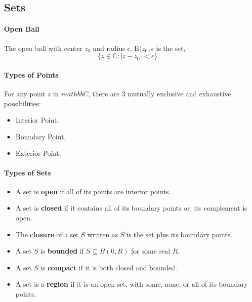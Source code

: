 \documentclass[12pt, letterpaper]{article}
\begin{document}
    \subsection{Sets}
    \paragraph{Open Ball}
    The open ball with center \(z_0\) and radius \(\epsilon\), \(\mathrm{B}(z_0, \epsilon\) is the set,
    \[\{z\in \mathbb{C}: |z-z_0| < \epsilon\}.\]
    
    \paragraph{Types of Points} For any point \(z\) in \(mathbb{C}\), there are 3 mutually exclusive and exhaustive possibilities:
    \begin{itemize}
        \item Interior Point,
        \item Boundary Point,
        \item Exterior Point.
    \end{itemize}
    
    \paragraph{Types of Sets}
    \begin{itemize}
        \item A set is \textbf{open} if all of its points are interior points.
        \item A set is \textbf{closed} if it contains all of its boundary points or, its complement is open.
        \item The \textbf{closure} of a set \(S\) written as \(\bar{S}\) is the set plus its boundary points.
        \item A set \(S\) is \textbf{bounded} if \(S\subseteq B(0, R)\) for some real \(R\).
        \item A set \(S\) is \textbf{compact} if it is both closed and bounded.
        \item A set is a \textbf{region} if it is an open set, with some, none, or all of its boundary points.
    \end{itemize}
\end{document}
